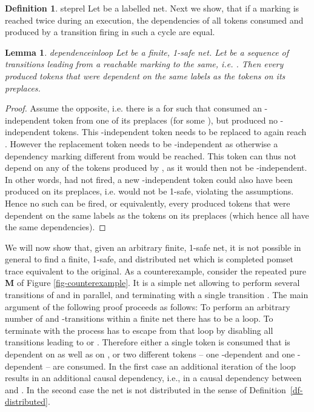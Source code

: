 \documentclass[submission,copyright,creativecommons]{eptcs}
\newtheorem{lemma}{Lemma}
\theoremstyle{definition}
\newtheorem{definition}{Definition}
\def\definitionname{Definition}
\newcommand{\refdf}[1]{\definitionname~\ref{df-#1}}
\begin{document}
\begin{definition}{steprel}{
  Let  be a labelled net.
  }
\noindent
Next we show, that if a marking is reached twice during an execution,
the dependencies of all tokens consumed and produced by a transition firing in
such a cycle are equal.

\begin{lemma}{dependenceinloop}{
  Let  be a finite, 1-safe net.
  Let  be a sequence of transitions
  leading from a reachable marking  to the same, i.e.
  .
  }
  Then every  produced tokens that were dependent
  on the same labels as the tokens on its preplaces.
\end{lemma}
\begin{proof}
  Assume the opposite, i.e. there is a  for  such that 
  consumed an -independent token from one of its preplaces (for some ),
  but produced no -independent tokens.
  This -independent token needs to be replaced to again reach .
  However the replacement token needs to be -independent as otherwise a dependency marking
  different from  would be reached.
  This token can thus not depend on any of the tokens produced by , as it
  would then not be -independent.
  In other words, had  not fired, a new -independent
  token could also have been produced on its preplaces, i.e.  would not be
  1-safe, violating the assumptions. Hence no such  can be fired,
  or equivalently, every  produced tokens that were dependent
  on the same labels as the tokens on its preplaces (which hence all have the
  same dependencies).
\end{proof}

\noindent
We will now show that, given an arbitrary finite, 1-safe net, it is not possible in general to
find a finite, 1-safe, and distributed net which is completed pomset trace
equivalent to the original. As a counterexample, consider the repeated pure \textbf{M} of Figure
\ref{fig-counterexample}. It is a simple net allowing to perform several
transitions of  and  in parallel, and terminating with a single
transition . The main argument of the following proof proceeds as follows: To perform an
arbitrary number of  and -transitions within a finite net there has to be a
loop. To terminate with  the process has to escape from that loop by
disabling all transitions leading to  or . Therefore either a single token is
consumed that is dependent on  as well as on , or two different tokens -- one
-dependent and one -dependent -- are consumed. In the first case an
additional iteration of the loop results in an additional causal dependency,
i.e., in a causal dependency between  and . In the second case the net is
not distributed in the sense of \refdf{distributed}.


\end{definition}
\end{document}
